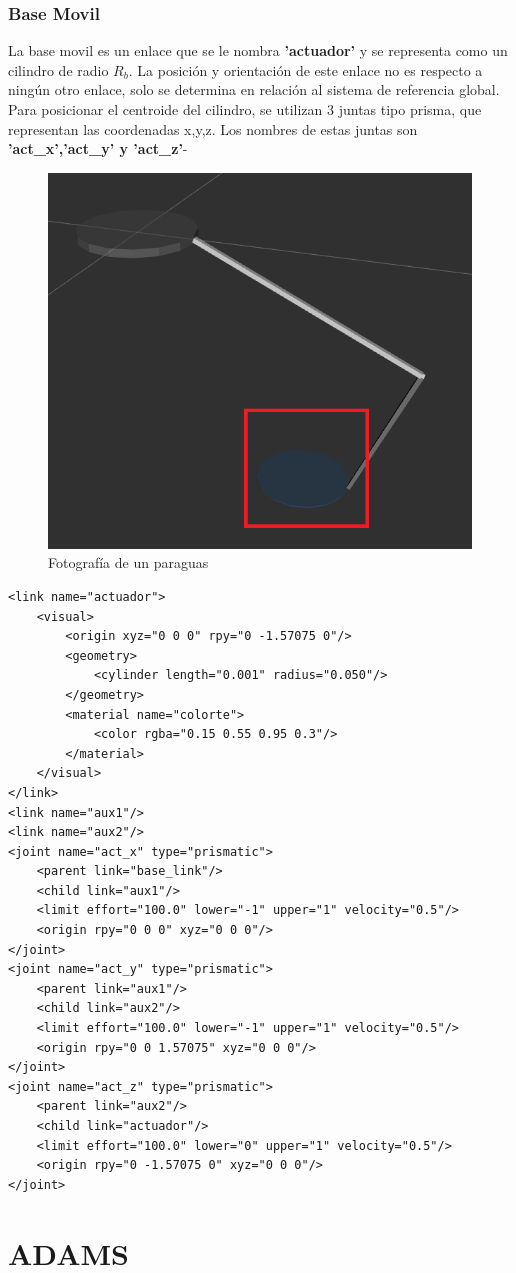 \begin{lstlisting}
        \end{lstlisting}
       

       \subsubsection{Base Movil}

        La base movil es un enlace que se le nombra \textbf{'actuador'} y se representa como un cilindro de radio \textbf{$R_b$}. La posición y orientación de este enlace no es respecto a ningún otro enlace, solo se determina en relación al sistema de referencia global. Para posicionar el centroide del cilindro, se utilizan 3 juntas tipo prisma, que representan las coordenadas x,y,z. Los nombres de estas juntas son \textbf{'act\_x','act\_y' y 'act\_z'}-

        \begin{figure}[h]
                \centering
                \includegraphics[width=0.4\linewidth]{Main/Chapter6/Images6/cap6_basemovil.png}
                \caption{Fotografía de un paraguas}
                \label{f:Cap6_urdf_4}
            \end{figure}

        \lstset{language=XML}
        \begin{lstlisting}
<link name="actuador">
	<visual>
		<origin xyz="0 0 0" rpy="0 -1.57075 0"/>
		<geometry>
			<cylinder length="0.001" radius="0.050"/>
		</geometry>
		<material name="colorte">
			<color rgba="0.15 0.55 0.95 0.3"/>
		</material>
	</visual>
</link>
<link name="aux1"/>
<link name="aux2"/>
<joint name="act_x" type="prismatic">
	<parent link="base_link"/>
	<child link="aux1"/>
	<limit effort="100.0" lower="-1" upper="1" velocity="0.5"/>
	<origin rpy="0 0 0" xyz="0 0 0"/>
</joint>
<joint name="act_y" type="prismatic">
	<parent link="aux1"/>
	<child link="aux2"/>
	<limit effort="100.0" lower="-1" upper="1" velocity="0.5"/>
	<origin rpy="0 0 1.57075" xyz="0 0 0"/>
</joint>
<joint name="act_z" type="prismatic">
	<parent link="aux2"/>
	<child link="actuador"/>
	<limit effort="100.0" lower="0" upper="1" velocity="0.5"/>
	<origin rpy="0 -1.57075 0" xyz="0 0 0"/>
</joint>
        \end{lstlisting}

      \newpage
  
  



    \newpage


\section{ADAMS}
